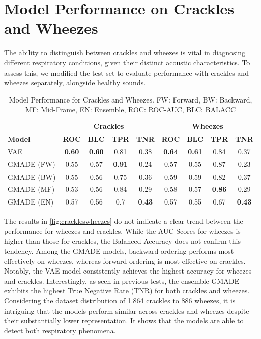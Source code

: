\section{Model Performance on Crackles and Wheezes}
The ability to distinguish between crackles and wheezes is vital in diagnosing different respiratory conditions, given their distinct acoustic characteristics. To assess this, we modified the test set to evaluate performance with crackles and wheezes separately, alongside healthy sounds.

\begin{table}[h!]
    \centering
    \caption{Model Performance for Crackles and Wheezes. FW: Forward, BW: Backward, MF: Mid-Frame, EN: Ensemble, ROC: ROC-AUC, BLC: BALACC}
    \begin{tabular}{|l|c|c|c|c||c|c|c|c|}
    \hline
    & \multicolumn{4}{c||}{\textbf{Crackles}} & \multicolumn{4}{c|}{\textbf{Wheezes}} \\
    \cline{2-9}
    \textbf{Model} & \textbf{ROC} & \textbf{BLC} & \textbf{TPR} & \textbf{TNR} & \textbf{ROC} & \textbf{BLC} & \textbf{TPR} & \textbf{TNR} \\
    \hline
    VAE & \textbf{0.60} & \textbf{0.60} & 0.81 & 0.38 & \textbf{0.64} & \textbf{0.61} & 0.84 & 0.37 \\
    GMADE (FW) & 0.55 & 0.57 & \textbf{0.91} & 0.24 & 0.57 & 0.55 & 0.87 & 0.23 \\
    GMADE (BW) & 0.55 & 0.56 & 0.75 & 0.36 & 0.59 & 0.59 & 0.82 & 0.37 \\
    GMADE (MF) & 0.53 & 0.56 & 0.84 & 0.29 & 0.58 & 0.57 & \textbf{0.86} & 0.29 \\
    GMADE (EN) & 0.57 & 0.56 & 0.7 & \textbf{0.43} & 0.57 & 0.55 & 0.67 & \textbf{0.43} \\
    \hline
    \end{tabular}
    \label{fig:crackleswheezes}
\end{table}

The results in \autoref{fig:crackleswheezes} do not indicate a clear trend between the performance for wheezes and crackles. While the AUC-Scores for wheezes is higher than those for crackles, the Balanced Accuracy does not confirm this tendency. Among the GMADE models, backward ordering performs most effectively on wheezes, whereas forward ordering is most effective on crackles. Notably, the VAE model consistently achieves the highest accuracy for wheezes and crackles. Interestingly, as seen in previous tests, the ensemble GMADE exhibits the highest True Negative Rate (TNR) for both crackles and wheezes.\\
Considering the dataset distribution of 1.864 crackles to 886 wheezes, it is intriguing that the models perform similar across crackles and wheezes despite their substantially lower representation. It shows that the models are able to detect both respiratory phenomena.

